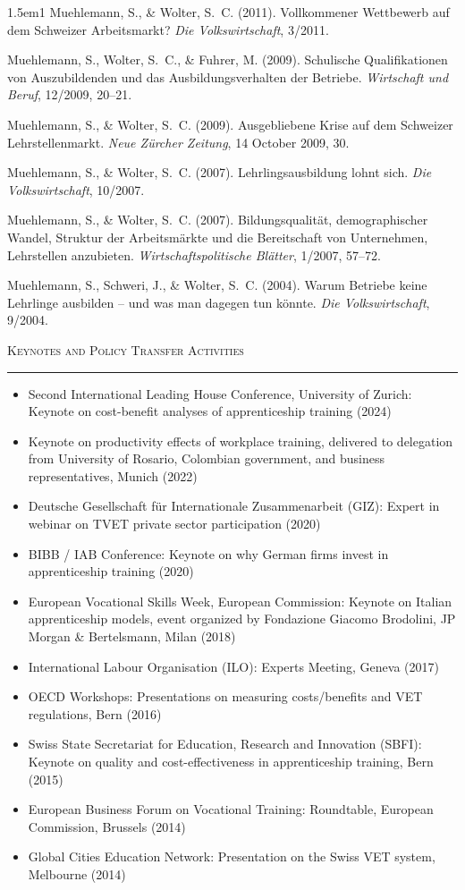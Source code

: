 \documentclass[11pt,a4paper]{article}
\newcommand{\cvsection}[1]{%
  \vspace{1.1em}%
  {\large\textsc{#1}}\par
  \vspace{0.15em}\hrule\vspace{0.65em}%
}
\begin{document}
\begin{hangparas}{1.5em}{1}
Muehlemann, S., \& Wolter, S.~C. (2011). Vollkommener Wettbewerb auf dem Schweizer Arbeitsmarkt? \textit{Die Volkswirtschaft}, 3/2011.

Muehlemann, S., Wolter, S.~C., \& Fuhrer, M. (2009). Schulische Qualifikationen von Auszubildenden und das Ausbildungsverhalten der Betriebe. \textit{Wirtschaft und Beruf}, 12/2009, 20--21.

Muehlemann, S., \& Wolter, S.~C. (2009). Ausgebliebene Krise auf dem Schweizer Lehrstellenmarkt. \textit{Neue Z\"urcher Zeitung}, 14 October 2009, 30.

Muehlemann, S., \& Wolter, S.~C. (2007). Lehrlingsausbildung lohnt sich. \textit{Die Volkswirtschaft}, 10/2007.

Muehlemann, S., \& Wolter, S.~C. (2007). Bildungsqualit\"at, demographischer Wandel, Struktur der Arbeitsm\"arkte und die Bereitschaft von Unternehmen, Lehrstellen anzubieten. \textit{Wirtschaftspolitische Bl\"atter}, 1/2007, 57--72.

Muehlemann, S., Schweri, J., \& Wolter, S.~C. (2004). Warum Betriebe keine Lehrlinge ausbilden -- und was man dagegen tun k\"onnte. \textit{Die Volkswirtschaft}, 9/2004.

\end{hangparas}

\cvsection{Keynotes and Policy Transfer Activities}

\begin{itemize}[leftmargin=1.2em,itemsep=0.15em,topsep=0pt]
  \item Second International Leading House Conference, University of Zurich: Keynote on cost-benefit analyses of apprenticeship training (2024)
  \item Keynote on productivity effects of workplace training, delivered to delegation from University of Rosario, Colombian government, and business representatives, Munich (2022)
  \item Deutsche Gesellschaft f\"ur Internationale Zusammenarbeit (GIZ): Expert in webinar on TVET private sector participation (2020)
  \item BIBB / IAB Conference: Keynote on why German firms invest in apprenticeship training (2020)
  \item European Vocational Skills Week, European Commission: Keynote on Italian apprenticeship models, event organized by Fondazione Giacomo Brodolini, JP Morgan \& Bertelsmann, Milan (2018)
  \item International Labour Organisation (ILO): Experts Meeting, Geneva (2017)
  \item OECD Workshops: Presentations on measuring costs/benefits and VET regulations, Bern (2016)
  \item Swiss State Secretariat for Education, Research and Innovation (SBFI): Keynote on quality and cost-effectiveness in apprenticeship training, Bern (2015)
  \item European Business Forum on Vocational Training: Roundtable, European Commission, Brussels (2014)
  \item Global Cities Education Network: Presentation on the Swiss VET system, Melbourne (2014)
\end{itemize}
\end{document}
